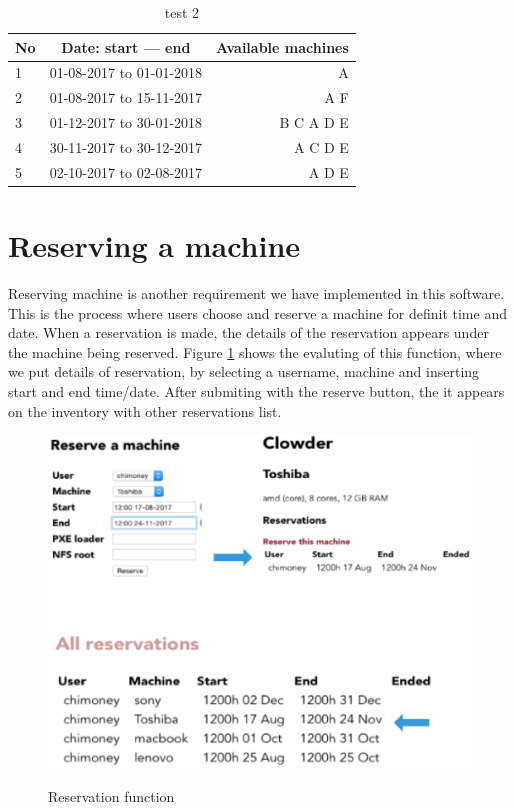 \begin{table}[h!]
  \centering
  \label{tab:table1}
  \begin{tabular}{l|c||r}
    No & Date: start --- end & Available machines\\
    \hline
    1 &01-08-2017 to 01-01-2018  & A \\
    2 &01-08-2017 to 15-11-2017  & A F\\
    3 &01-12-2017 to 30-01-2018  & B C A D E \\
    4 &30-11-2017 to 30-12-2017  & A  C D E\\
    5 &02-10-2017 to 02-08-2017  & A  D E \\
   
  \end{tabular}
  \caption{test 2}
\end{table}

\section*{Reserving a machine}
Reserving machine is another requirement we have implemented in this software. This is the process where users choose and reserve a machine for definit time and date. When a reservation is made, the details of the reservation appears under the machine being reserved. Figure \ref{fig:reserve} shows the evaluting of this function, where we put details of reservation, by selecting a username, machine and inserting start and end time/date. After submiting with the reserve button, the it appears on the inventory with other reservations list. 
\pagebreak
\begin{figure}[h]
  \includegraphics[width=\linewidth]{reserve.eps}
  \label{fig:reserve}
  \caption{Reservation function}
\end{figure}

